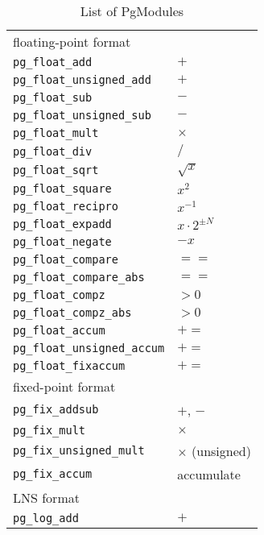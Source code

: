 \documentclass{article}
\begin{document}
\begin{table}[t]
\caption{List of PgModules}\label{tabpgmod}
\begin{minipage}[b]{1.0\linewidth}\centering
\renewcommand{\arraystretch}{1.2}
\begin{center}
{\scriptsize
\begin{tabular}{ll}

	floating-point format & \\
	    {\tt pg\_float\_add}           &  $+$\\
	    {\tt pg\_float\_unsigned\_add} &  $+$\\
	    {\tt pg\_float\_sub}           &  $-$\\
	    {\tt pg\_float\_unsigned\_sub} &  $-$\\
	    {\tt pg\_float\_mult}          &  $\times$\\
	    {\tt pg\_float\_div}           &  $/$ \\
	    {\tt pg\_float\_sqrt}          &  $\sqrt{x}$ \\
	    {\tt pg\_float\_square}        &  $x^2$\\
	    {\tt pg\_float\_recipro}       &  $x^{-1}$\\
	    {\tt pg\_float\_expadd}        &  $x \cdot 2^{\pm N}$\\
	    {\tt pg\_float\_negate}        &  $-x$\\
	    {\tt pg\_float\_compare}       &  $==$\\
	    {\tt pg\_float\_compare\_abs}  &  $==$\\
	    {\tt pg\_float\_compz}         &  $>0$\\
	    {\tt pg\_float\_compz\_abs}    &  $>0$\\
	    {\tt pg\_float\_accum}         &  $+=$\\
	    {\tt pg\_float\_unsigned\_accum}& $+=$\\
	    {\tt pg\_float\_fixaccum}      &  $+=$\\
	\hline
	fixed-point format & \\
	{\tt pg\_fix\_addsub}          &  $+$, $-$\\
	{\tt pg\_fix\_mult}            &  $\times$\\
	{\tt pg\_fix\_unsigned\_mult}  &  $\times$ (unsigned)\\
	{\tt pg\_fix\_accum}           &  accumulate\\
	\hline
	LNS format& \\
	{\tt pg\_log\_add}             &  $+$\\

\end{tabular}}
\end{center}
\end{minipage}
\end{table}
\end{document}
